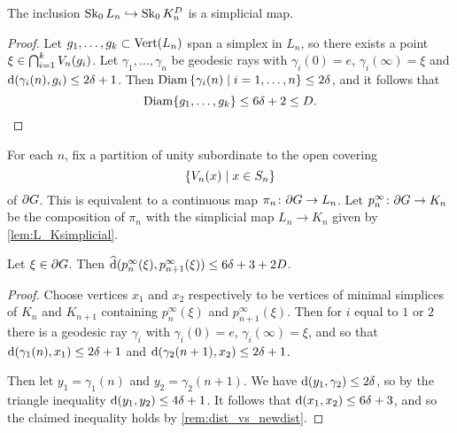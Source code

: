 \documentclass[a4paper]{article}
\begin{document}
\begin{lemma}\label{lem:L_Ksimplicial}
  The inclusion $\operatorname{Sk}_0 L_n \hookrightarrow \operatorname{Sk}_0 K_n^D$ is a simplicial map.
\end{lemma}

\begin{proof}
  Let $g_1, \dotsc, g_k \subset \operatorname{Vert}(L_n)$ span a simplex in $L_n$, so 
  there exists a point $\xi \in \bigcap_{i=1}^k V_n(g_i)$.  Let
  $\gamma_1, \dotsc, \gamma_n$ be geodesic rays with $\gamma_i(0) = e$,
  $\gamma_i(\infty) = \xi$ and $\operatorname{d}(\gamma_i(n), g_i) \leq 2\delta+1$.
  Then $\operatorname{Diam}\left\{\gamma_i(n) \mid i=1, \dotsc, n\right\} \leq 2\delta$, and it
  follows that
  \begin{equation*}
    \operatorname{Diam}\{g_1, \dotsc, g_k\} \leq 6\delta+ 2 \leq D.\qedhere
  \end{equation*}
\end{proof}

For each $n$, fix a partition of unity subordinate to the open covering 
\begin{equation*}
  \left\{V_n(x) \mid x \in S_n\right\}
\end{equation*} 
of $\partial G$. This is equivalent to a continuous map $\pi_n \colon \partial
G \to L_n$. Let $p^\infty_n\colon\partial G\to K_n$ be the composition of
$\pi_n$ with the simplicial map $L_n \to K_n$ given by
\cref{lem:L_Ksimplicial}.

\begin{lemma}\label{lem:close_projections}
  Let $\xi \in \partial G$. Then $\operatorname{\widehat{d}}(p^\infty_n(\xi),
  p^\infty_{n+1}(\xi)) \leq 6\delta+3 + 2D$.
\end{lemma}

\begin{proof}
  Choose vertices $x_1$ and $x_2$ respectively to be vertices of minimal
  simplices of $K_n$ and $K_{n+1}$ containing $p^\infty_n(\xi)$ and
  $p^\infty_{n+1}(\xi)$. Then for $i$ equal to $1$ or $2$ there is a geodesic
  ray $\gamma_i$ with $\gamma_i(0) = e$, $\gamma_i(\infty) = \xi$, and so that
  $\operatorname{d}(\gamma_1(n), x_1) \leq 2\delta+1$ and $\operatorname{d}(\gamma_2(n+1),
  x_2) \leq 2\delta+1$.

  Then let $y_1 = \gamma_1(n)$ and $y_2 = \gamma_2(n+1)$. We have
  $\operatorname{d}(y_1, \gamma_2) \leq 2\delta$, so by the triangle inequality
  $\operatorname{d}(y_1, y_2) \leq 4\delta +1$. It follows that $\operatorname{d}(x_1, x_2)
  \leq 6\delta+3$, and so the claimed inequality holds by
  \cref{rem:dist_vs_newdist}.
\end{proof}
\end{document}
